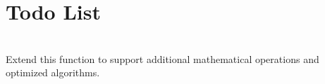 \chapter{Todo List }
\hypertarget{todo}{}\label{todo}

\begin{DoxyRefList}
\item[{\parbox[t]{\linewidth}{Member \doxylink{class_calculation_engine_af96aad4a7a10f6bd17dc17d1f4df1c51}{Calculation\+Engine::power} (double base, int exponent)}}]\hfill \\
\label{todo__todo000001}%
%
Extend this function to support additional mathematical operations and optimized algorithms.
\end{DoxyRefList}